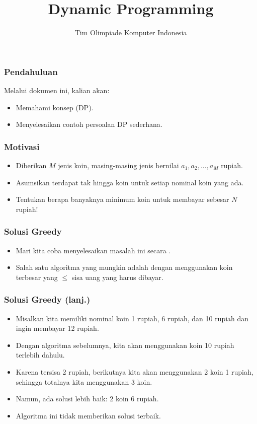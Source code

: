

\title{Dynamic Programming}
\author{Tim Olimpiade Komputer Indonesia}
\date{}

\usepackage{qtree}


\begin{frame}
\titlepage
\end{frame}

\begin{frame}
\frametitle{Pendahuluan}
Melalui dokumen ini, kalian akan:
\begin{itemize}
  \item Memahami konsep  (DP).
  \item Menyelesaikan contoh persoalan DP sederhana.
\end{itemize}
\end{frame}

\begin{frame}
\frametitle{Motivasi}
\begin{itemize}
  \item Diberikan $M$ jenis koin, masing-masing jenis bernilai $a_1, a_2, ..., a_M$ rupiah.
  \item Asumsikan terdapat tak hingga koin untuk setiap nominal koin yang ada. 
  \item Tentukan berapa banyaknya minimum koin untuk membayar sebesar $N$ rupiah!
\end{itemize}
\end{frame}

\begin{frame}
\frametitle{Solusi Greedy}
\begin{itemize}
  \item Mari kita coba menyelesaikan masalah ini secara \fGreedy.
  \item Salah satu algoritma \fGreedy yang mungkin adalah dengan menggunakan koin terbesar yang $\leq$ sisa uang yang harus dibayar.
\end{itemize}
\end{frame}

\begin{frame}
\frametitle{Solusi Greedy (lanj.)}
\begin{itemize}
  \item Misalkan kita memiliki nominal koin 1 rupiah, 6 rupiah, dan 10 rupiah dan ingin membayar 12 rupiah.
  \item Dengan algoritma sebelumnya, kita akan menggunakan koin 10 rupiah terlebih dahulu. 
  \item Karena tersisa 2 rupiah, berikutnya kita akan menggunakan 2 koin 1 rupiah, sehingga totalnya kita menggunakan 3 koin.
  \item Namun, ada solusi lebih baik: 2 koin 6 rupiah.
  \item Algoritma \fGreedy ini tidak memberikan solusi terbaik.
\end{itemize}
\end{frame}

